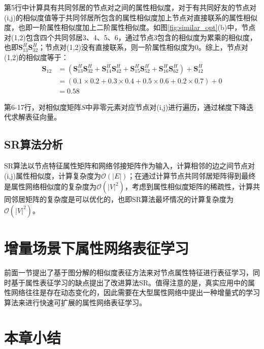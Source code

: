第5行中计算具有共同邻居的节点对之间的属性相似度，对于有共同好友的节点对(i,j)的相似度值等于共同邻居所包含的属性相似度加上节点对直接联系的属性相似度，也即一阶属性相似度加上二阶属性相似度。如图\ref{fig:similar_opt}(b)中，节点对(1,2)包含四个共同邻居3、4、5、6，通过节点3包含的相似度为累乘的相似度，也即$\textbf{S}^H_{13}\textbf{S}^H_{32}$；节点对(1,2)没有直接联系，则一阶属性相似度为0。综上，节点对(1,2)的相似度等于：
\begin{equation}
\begin{aligned}
\textbf{S}_{12} &= (\textbf{S}^H_{13}\textbf{S}^H_{32}+ \textbf{S}^H_{14}\textbf{S}^H_{42}+ \textbf{S}^H_{15}\textbf{S}^H_{52}+\textbf{S}^H_{16}\textbf{S}^H_{62})+ \textbf{S}^H_{12} \\
 &=(0.1\times 0.2 + 0.3\times 0.4 +0.5\times 0.6 +0.2\times 0.7) + 0 \\
 &= 0.58
\end{aligned} 
\end{equation}

第6-17行，对相似度矩阵$S$中非零元素对应节点对(i,j)进行遍历，通过梯度下降迭代求解表征向量。
\subsection{SR算法分析}
SR算法以节点特征属性矩阵和网络邻接矩阵作为输入，计算相邻的边之间节点对(i,j)属性相似度，计算复杂度为$\mathcal{O}(|E|)$；在通过计算节点共同邻居矩阵得到最终是属性网络相似度的复杂度为$\mathcal{O}(|V|^2)$，考虑到属性相似度矩阵的稀疏性，计算共同邻居矩阵的复杂度是可以优化的，也即SR算法最坏情况的计算复杂度为$\mathcal{O}(|V|^2)$。

\section{增量场景下属性网络表征学习}
前面一节提出了基于图分解的相似度表征方法来对节点属性特征进行表征学习，同时基于属性表征学习的缺点提出了改进算法SR。值得注意的是，真实应用中的属性网络往往是存在动态变化的，因此需要在大型属性网络中提出一种增量式的学习算法来进行快速可扩展的属性网络表征学习。                                                                                 




\section{本章小结}
